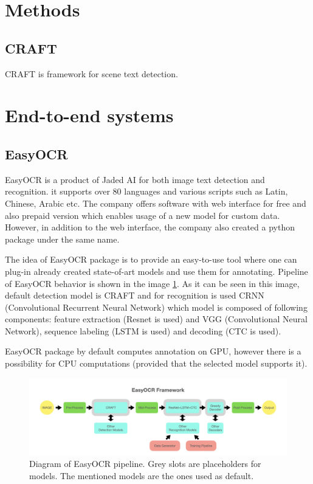 \section*{Methods}
\subsection{CRAFT}

CRAFT is framework for scene text detection.

\section{End-to-end systems}

\subsection{EasyOCR}

EasyOCR is a product of Jaded AI for both image text detection and recognition. it supports over 80 languages and various scripts such as Latin, Chinese, Arabic etc. The company offers software with web interface for free and also prepaid version which enables usage of a new model for custom data. However, in addition to the web interface, the company also created a python package under the same name.\cite{easyocr1}

The idea of EasyOCR package is to provide an easy-to-use tool where one can plug-in already created state-of-art models and use them for annotating. Pipeline of EasyOCR behavior is shown in the image \ref*{img:easyocrPipeline}. As it can be seen in this image, default detection model is CRAFT and for recognition is used CRNN (Convolutional Recurrent Neural Network) which model is composed of following components: feature extraction (Resnet is used) and VGG (Convolutional Neural Network), sequence labeling (LSTM is used) and decoding (CTC is used).\cite{easyocr2}

EasyOCR package by default computes annotation on GPU, however there is a possibility for CPU computations (provided that the selected model supports it). 

\begin{figure}[hbtp]
    \centering
    \includegraphics[scale=0.4]{obrazky/easyocr_framework.jpeg}
    \caption{Diagram of EasyOCR pipeline. Grey slots are placeholders for models. The mentioned models are the ones used as default. \cite{easyocr2}}
    \label{img:easyocrPipeline}
\end{figure}

